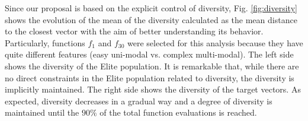 
Since our proposal is based on the explicit control of diversity, Fig. \ref{fig:diversity} shows the evolution of the mean of the diversity calculated
as the mean distance to the closest vector with the aim of better understanding its behavior.
%
Particularly, functions $f_1$ and $f_{30}$ were selected for this analysis because they have quite different features (easy uni-modal vs. complex multi-modal).
%
The left side shows the diversity of the Elite population.
%
It is remarkable that, while there are no direct constraints in the Elite population related to diversity, 
the diversity is implicitly maintained.
%
The right side shows the diversity of the target vectors.
%
As expected, diversity decreases in a gradual way and a degree of diversity is maintained until the $90\%$ of the total function evaluations is reached.

